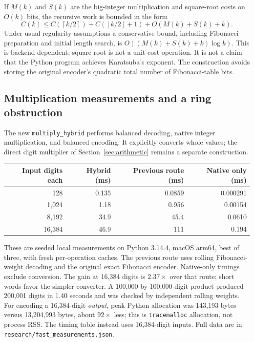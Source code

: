 \documentclass[11pt]{article}
\theoremstyle{definition}\newtheorem{definition}[theorem]{Definition}
\newcommand{\fl}[1]{\left\lfloor #1\right\rfloor}
\newcommand{\cl}[1]{\left\lceil #1\right\rceil}
\begin{document}
If $M(k)$ and $S(k)$ are the big-integer multiplication and square-root
costs on $O(k)$ bits, the recursive work is bounded in the form
\[
 C(k)\le C(\cl{k/2})+C(\fl{k/2}+1)+O(M(k)+S(k)+k).
\]
Under usual regularity assumptions a conservative bound, including
Fibonacci preparation and initial length search, is
$O((M(k)+S(k)+k)\log k)$. This is backend dependent; square root is
not a unit-cost operation. It is not a claim that the Python program
achieves Karatsuba's exponent. The construction avoids storing the
original encoder's quadratic total number of Fibonacci-table bits.

\subsection{Multiplication measurements and a ring obstruction}
The new \texttt{multiply\_hybrid} performs balanced decoding, native
integer multiplication, and balanced encoding. It explicitly converts
whole values; the direct digit multiplier of Section~\ref{sec:arithmetic}
remains a separate construction.

\begin{center}
\begin{tabular}{rrrr}
\toprule
Input digits each & Hybrid (ms) & Previous route (ms) & Native only (ms)\\
\midrule
128 & 0.135 & 0.0859 & 0.000291\\
1,024 & 1.18 & 0.956 & 0.00154\\
8,192 & 34.9 & 45.4 & 0.0610\\
16,384 & 46.9 & 111 & 0.194\\
\bottomrule
\end{tabular}
\end{center}
These are seeded local measurements on Python 3.14.4, macOS arm64,
best of three, with fresh per-operation caches. The previous route uses
rolling Fibonacci-weight decoding and the original exact Fibonacci
encoder. Native-only timings exclude conversion. The gain at 16,384
digits is $2.37\times$ over that route; short words favor the simpler
converter. A 100,000-by-100,000-digit product produced 200,001 digits
in 1.40 seconds and was checked by independent rolling weights.
For encoding a 16,384-digit \emph{output}, peak Python allocation was
143,193 bytes versus 13,204,993 bytes, about $92\times$ less; this is
\texttt{tracemalloc} allocation, not process RSS. The timing table instead
uses 16,384-digit inputs. Full data are in
\texttt{research/fast\_measurements.json}.
\end{document}
